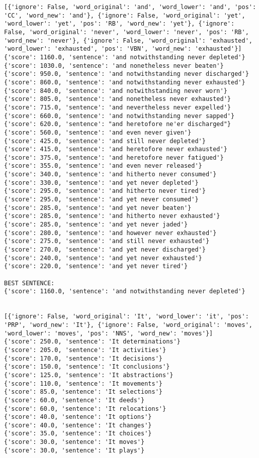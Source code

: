 \documentclass[12pt,a4paper,oneside]{book}
\begin{document}
\begin{verbatim}
[{'ignore': False, 'word_original': 'and', 'word_lower': 'and', 'pos': 'CC', 'word_new': 'and'}, {'ignore': False, 'word_original': 'yet', 'word_lower': 'yet', 'pos': 'RB', 'word_new': 'yet'}, {'ignore': False, 'word_original': 'never', 'word_lower': 'never', 'pos': 'RB', 'word_new': 'never'}, {'ignore': False, 'word_original': 'exhausted', 'word_lower': 'exhausted', 'pos': 'VBN', 'word_new': 'exhausted'}]
{'score': 1160.0, 'sentence': 'and notwithstanding never depleted'}
{'score': 1030.0, 'sentence': 'and nonetheless never beaten'}
{'score': 950.0, 'sentence': 'and notwithstanding never discharged'}
{'score': 860.0, 'sentence': 'and notwithstanding never exhausted'}
{'score': 840.0, 'sentence': 'and notwithstanding never worn'}
{'score': 805.0, 'sentence': 'and nonetheless never exhausted'}
{'score': 715.0, 'sentence': 'and nevertheless never expelled'}
{'score': 660.0, 'sentence': 'and notwithstanding never sapped'}
{'score': 620.0, 'sentence': "and heretofore ne'er discharged"}
{'score': 560.0, 'sentence': 'and even never given'}
{'score': 425.0, 'sentence': 'and still never depleted'}
{'score': 415.0, 'sentence': 'and heretofore never exhausted'}
{'score': 375.0, 'sentence': 'and heretofore never fatigued'}
{'score': 355.0, 'sentence': 'and even never released'}
{'score': 340.0, 'sentence': 'and hitherto never consumed'}
{'score': 330.0, 'sentence': 'and yet never depleted'}
{'score': 295.0, 'sentence': 'and hitherto never tired'}
{'score': 295.0, 'sentence': 'and yet never consumed'}
{'score': 285.0, 'sentence': 'and yet never beaten'}
{'score': 285.0, 'sentence': 'and hitherto never exhausted'}
{'score': 285.0, 'sentence': 'and yet never jaded'}
{'score': 280.0, 'sentence': 'and however never exhausted'}
{'score': 275.0, 'sentence': 'and still never exhausted'}
{'score': 270.0, 'sentence': 'and yet never discharged'}
{'score': 240.0, 'sentence': 'and yet never exhausted'}
{'score': 220.0, 'sentence': 'and yet never tired'}

BEST SENTENCE:
{'score': 1160.0, 'sentence': 'and notwithstanding never depleted'}


[{'ignore': False, 'word_original': 'It', 'word_lower': 'it', 'pos': 'PRP', 'word_new': 'It'}, {'ignore': False, 'word_original': 'moves', 'word_lower': 'moves', 'pos': 'NNS', 'word_new': 'moves'}]
{'score': 250.0, 'sentence': 'It determinations'}
{'score': 205.0, 'sentence': 'It activities'}
{'score': 170.0, 'sentence': 'It decisions'}
{'score': 150.0, 'sentence': 'It conclusions'}
{'score': 125.0, 'sentence': 'It abstractions'}
{'score': 110.0, 'sentence': 'It movements'}
{'score': 85.0, 'sentence': 'It selections'}
{'score': 60.0, 'sentence': 'It deeds'}
{'score': 60.0, 'sentence': 'It relocations'}
{'score': 40.0, 'sentence': 'It options'}
{'score': 40.0, 'sentence': 'It changes'}
{'score': 35.0, 'sentence': 'It choices'}
{'score': 30.0, 'sentence': 'It moves'}
{'score': 30.0, 'sentence': 'It plays'}


\end{verbatim}
\end{document}
